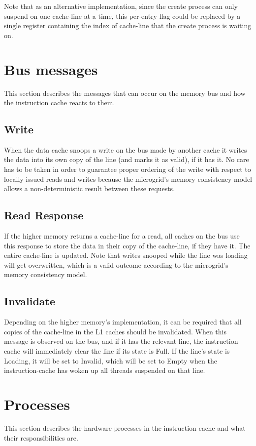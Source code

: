 Note that as an alternative implementation, since the create process can only suspend on one cache-line at a time, this per-entry flag could be replaced by a single register containing the index of cache-line that the create process is waiting on.

\section{Bus messages}
This section describes the messages that can occur on the memory bus and how the instruction cache reacts to them.

\subsection{Write}
When the data cache snoops a write on the bus made by another cache it writes the data into its own copy of the line (and marks it as valid), if it has it. No care has to be taken in order to guarantee proper ordering of the write with respect to locally issued reads and writes because the microgrid's memory consistency model allows a non-deterministic result between these requests.

\subsection{Read Response}
If the higher memory returns a cache-line for a read, all caches on the bus use this response to store the data in their copy of the cache-line, if they have it. The entire cache-line is updated. Note that writes snooped while the line was loading will get overwritten, which is a valid outcome according to the microgrid's memory consistency model.

\subsection{Invalidate}
Depending on the higher memory's implementation, it can be required that all copies of the cache-line in the L1 caches should be invalidated. When this message is observed on the bus, and if it has the relevant line, the instruction cache will immediately clear the line if its state is Full. If the line's state is Loading, it will be set to Invalid, which will be set to Empty when the instruction-cache has woken up all threads suspended on that line.


\section{Processes}
This section describes the hardware processes in the instruction cache and what their responsibilities are.

